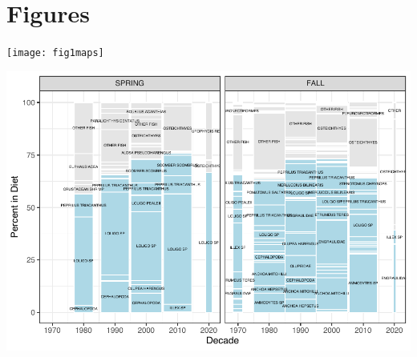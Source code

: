 \documentclass[
]{article}
\let\origfigure\figure
\let\endorigfigure\endfigure
\renewenvironment{figure}[1][2] {
    \expandafter\origfigure\expandafter[H]
} {
    \endorigfigure
}
\begin{document}
\newpage  
\listoffigures

\hypertarget{figures}{%
\section{Figures}\label{figures}}

\begin{figure}
\texttt{[image: fig1maps]} \caption{Maps of (a) Northeast USA states (ME = Maine, NH = New Hampshire, MA = Massachusetts, RI = Rhode Island, CT = Connecticut, NY = New York, NJ = New Jersey, DE = Delaware, MD = Maryland, VA = Virginia) and Atlantic coastal features, (b) areas corresponding to ecoregions Georges Bank (GB), Gulf of Maine (GOM), Mid Atlantic Bight (MAB), and bluefish assessment index areas in (c) bottom trawl survey index strata (SurveyBluefish), and (d) state waters within 3 miles of shore (StateWaters) within the combined Mid Atlantic Bight and Georges Bank (MABGB) region. The full VAST model grid is shown in brown. Base maps are from the R package sf with map projection NAD83 and coordinate system WGS84.}\label{fig:maps}
\end{figure}

\begin{figure}
\centering
\includegraphics{Bluefish_forageindex_CJFAS_files/figure-latex/seasondecade-1.pdf}
\caption{\label{fig:seasondecade}Bluefish diet by season and decade, NEFSC bottom trawl surveys. Light blue color in the plots shows included prey, while light gray sections represent unidentified fish and other categories not included in this analysis. Prey species are listed for those making up \textgreater3\% of diet by weight in a decade/season. Bar width indicates number of years with samples in the decade/season block. Full width bars had samples in all years.}
\end{figure}
\end{document}
